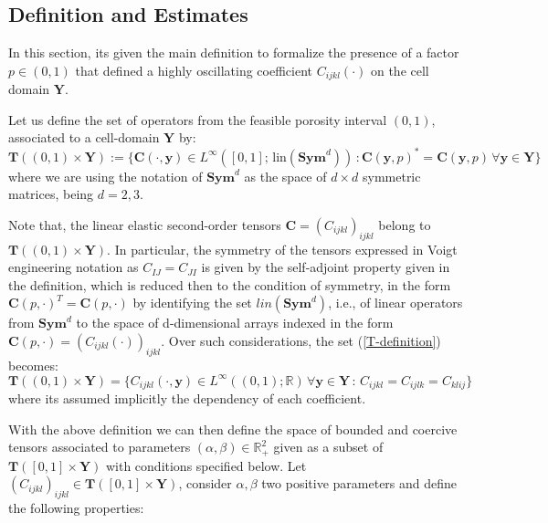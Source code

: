 \subsection{Definition and Estimates}
In this section, its given the main definition to formalize the presence of a factor $p \in (0,1)$ that defined a highly oscillating coefficient $C_{ijkl}(\cdot)$ on the cell domain $\mathbf{Y}$.
\begin{defn}
Let us define the set of operators from the feasible porosity interval $(0,1)$, associated to a cell-domain $\mathbf{Y}$ by:
\begin{equation}
    \label{T-definition}
    \mathbf{T}((0,1) \times \mathbf{Y}) := \big \{ \mathbf{C}(\cdot, \mathbf{y}) \in L^{\infty}([0,1]; \, \text{lin}(\textbf{Sym}^d))\, : \mathbf{C}(\mathbf{y}, p)^* = \mathbf{C}(\mathbf{y}, p) \, \forall \mathbf{y} \in \mathbf{Y}\big \}
\end{equation}
where we are using the notation of $\mathbf{Sym}^d$ as the space of $d\times d$ symmetric matrices, being $d=2,3$.
\end{defn}
\begin{rem}
Note that, the linear elastic second-order tensors $\mathbf{C} = (C_{ijkl})_{ijkl}$ belong to $\mathbf{T}((0,1)\times \mathbf{Y})$. In particular, the symmetry of the tensors expressed in Voigt engineering notation as $C_{IJ}=C_{JI}$ is given by the self-adjoint property given in the definition, which is reduced then to the condition of symmetry, in the form $\mathbf{C}(p, \cdot)^T = \mathbf{C}(p,\cdot)$ by identifying the set $lin(\mathbf{Sym}^d)$, i.e., of linear operators from $\mathbf{Sym}^d$ to the space of d-dimensional arrays indexed in the form $\mathbf{C}(p, \cdot) = (C_{ijkl} (\cdot) )_{ijkl}$.
Over such considerations, the set (\ref{T-definition}) becomes:
\begin{equation*}
    \mathbf{T}((0,1)\times \mathbf{Y}) = \big \{ C_{ijkl}(\cdot, \mathbf{y}) \in L^{\infty}((0,1); \mathbb{R}) \, \forall \mathbf{y} \in \mathbf{Y}\,:\, C_{ijkl} = C_{ijlk} = C_{klij} \big \}
\end{equation*}
where its assumed implicitly the dependency of each coefficient.
\end{rem}
With the above definition we can then define the space of bounded and coercive tensors associated to parameters $(\alpha,\beta) \in \mathbb{R}^2_+$ given as a subset of $\mathbf{T}([0,1]\times \mathbf{Y})$ with conditions specified below.
Let $(C_{ijkl})_{ijkl} \in \mathbf{T}([0,1]\times \mathbf{Y})$, consider $\alpha, \beta$ two positive parameters and define the following properties:
